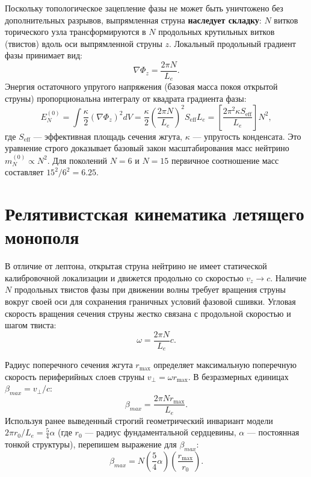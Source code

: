 \documentclass[12pt,a4paper]{article}
\begin{document}
Поскольку топологическое зацепление фазы не может быть уничтожено без дополнительных разрывов, выпрямленная струна \textbf{наследует складку}: $N$ витков торического узла трансформируются в $N$ продольных крутильных витков (твистов) вдоль оси выпрямленной струны $z$.
Локальный продольный градиент фазы принимает вид:
\begin{equation}
\nabla \Phi_z = \frac{2\pi N}{L_e}.
\end{equation}
Энергия остаточного упругого напряжения (базовая масса покоя открытой струны) пропорциональна интегралу от квадрата градиента фазы:
\begin{equation}
E_N^{(0)} = \int \frac{\kappa}{2} (\nabla \Phi_z)^2 dV = \frac{\kappa}{2} \left( \frac{2\pi N}{L_e} \right)^2 S_{\text{eff}} L_e = \left[ \frac{2\pi^2 \kappa S_{\text{eff}}}{L_e} \right] N^2,
\label{eq:base_mass}
\end{equation}
где $S_{\text{eff}}$ — эффективная площадь сечения жгута, $\kappa$ — упругость конденсата. Это уравнение строго доказывает базовый закон масштабирования масс нейтрино $m_N^{(0)} \propto N^2$. Для поколений $N=6$ и $N=15$ первичное соотношение масс составляет $15^2 / 6^2 = 6.25$.

\section{Релятивистская кинематика летящего монополя}

В отличие от лептона, открытая струна нейтрино не имеет статической калибровочной локализации и движется продольно со скоростью $v_z \to c$. Наличие $N$ продольных твистов фазы при движении волны требует вращения струны вокруг своей оси для сохранения граничных условий фазовой сшивки.
Угловая скорость вращения сечения струны жестко связана с продольной скоростью и шагом твиста:
\begin{equation}
\omega = \frac{2\pi N}{L_e} c.
\end{equation}

Радиус поперечного сечения жгута $r_{\text{max}}$ определяет максимальную поперечную скорость периферийных слоев струны $v_\perp = \omega r_{\text{max}}$. В безразмерных единицах $\beta_{max} = v_\perp / c$:
\begin{equation}
\beta_{max} = \frac{2\pi N r_{\text{max}}}{L_e}.
\end{equation}
Используя ранее выведенный строгий геометрический инвариант модели $2\pi r_0 / L_e = \frac{5}{4}\alpha$ (где $r_0$ — радиус фундаментальной сердцевины, $\alpha$ — постоянная тонкой структуры), перепишем выражение для $\beta_{max}$:
\begin{equation}
\beta_{max} = N \left( \frac{5}{4}\alpha \right) \left( \frac{r_{\text{max}}}{r_0} \right).
\label{eq:beta_max}
\end{equation}
\end{document}
